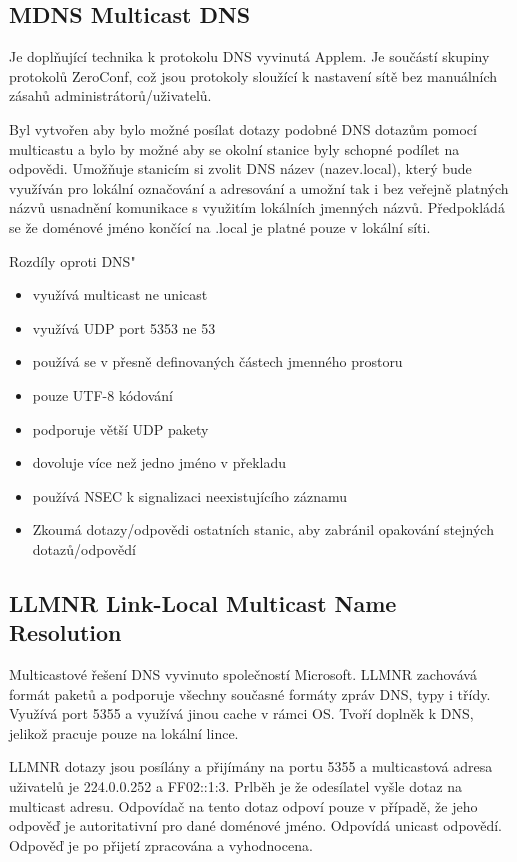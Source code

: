 \subsection{MDNS Multicast DNS}

Je doplňující technika k protokolu DNS vyvinutá Applem.
Je součástí skupiny protokolů ZeroConf, což jsou protokoly sloužící k nastavení sítě bez manuálních zásahů administrátorů/uživatelů.

Byl vytvořen aby bylo možné posílat dotazy podobné DNS dotazům pomocí multicastu a bylo by možné aby se okolní stanice byly schopné podílet na odpovědi.
Umožňuje stanicím si zvolit DNS název (nazev.local), který bude využíván pro lokální označování a adresování a umožní tak i bez veřejně platných názvů usnadnění komunikace s využitím lokálních jmenných názvů.
Předpokládá se že doménové jméno končící na .local je platné pouze v lokální síti.

Rozdíly oproti DNS"
\begin{itemize}[noitemsep]
    \item využívá multicast ne unicast
    \item využívá UDP port 5353 ne 53
    \item používá se v přesně definovaných částech jmenného prostoru
    \item pouze UTF-8 kódování
    \item podporuje větší UDP pakety
    \item dovoluje více než jedno jméno v překladu
    \item používá NSEC k signalizaci neexistujícího záznamu
    \item Zkoumá dotazy/odpovědi ostatních stanic, aby zabránil opakování stejných dotazů/odpovědí
\end{itemize}

\subsection{LLMNR Link-Local Multicast Name Resolution}

Multicastové řešení DNS vyvinuto společností Microsoft.
LLMNR zachovává formát paketů a podporuje všechny současné formáty zpráv DNS, typy i třídy.
Využívá port 5355 a využívá jinou cache v rámci OS.
Tvoří doplněk k DNS, jelikož pracuje pouze na lokální lince.

LLMNR dotazy jsou posílány a přijímány na portu 5355 a multicastová adresa uživatelů je 224.0.0.252 a FF02::1:3.
Prlběh je že odesílatel vyšle dotaz na multicast adresu.
Odpovídač na tento dotaz odpoví pouze v případě, že jeho odpověď je autoritativní pro dané doménové jméno.
Odpovídá unicast odpovědí.
Odpověď je po přijetí zpracována a vyhodnocena.


